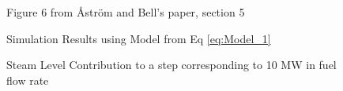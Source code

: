         \begin{figure}[ht]
            \begin{center}
                
                Figure 6 from \r{A}str\"{o}m and Bell's paper, section 5 \cite{Astrom}    
                
                
                Simulation Results using Model from Eq \eqref{eq:Model_1}
                
                \caption{Steam Level Contribution to a step corresponding to 10 MW in fuel flow rate}
                \label{fig:Fig6C}
            \end{center}
        \end{figure}  %
            
